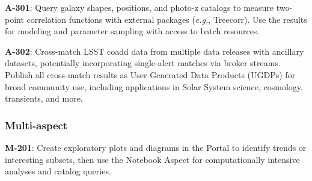 \textbf{A-301}: Query galaxy shapes, positions, and photo-z catalogs to measure two-point correlation functions with external packages (\emph{e.g.}, Treecorr).
Use the results for modeling and parameter sampling with access to batch resources.

\textbf{A-302}: Cross-match LSST coadd data from multiple data releases with ancillary datasets, potentially incorporating single-alert matches via broker streams.
Publish all cross-match results as User Generated Data Products (UGDPs) for broad community use, including applications in Solar System science, cosmology, transients, and more.

\subsubsection{Multi-aspect}

\textbf{M-201}: Create exploratory plots and diagrams in the Portal to identify trends or interesting subsets, then use the Notebook Aspect for computationally intensive analyses and catalog queries.
